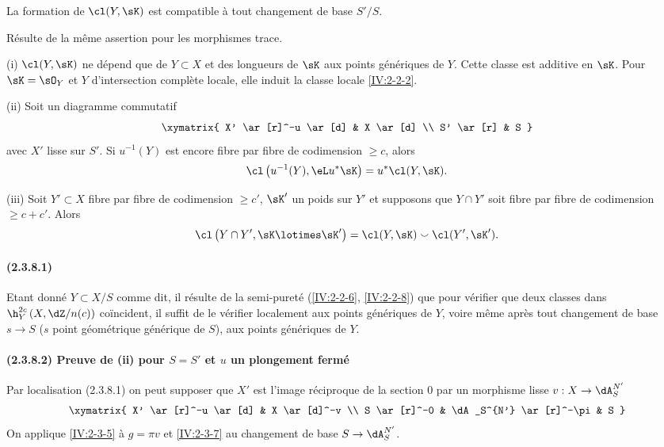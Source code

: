 \begin{lemma}\label{IV:2-3-7}
La formation de $\cl(Y,\sK)$ est compatible à tout changement de base 
$S'/S$.
\end{lemma}

Résulte de la même assertion pour les morphismes trace.





\begin{theorem}\label{IV:2-3-8}
(i) $\cl(Y,\sK)$ ne dépend que de $Y\subset X$ et des longueurs de $\sK$ aux 
points génériques de $Y$. Cette classe est additive en $\sK$. Pour 
$\sK=\sO_Y$ et $Y$ d'intersection complète locale, elle induit la classe 
locale \ref{IV:2-2-2}.

(ii) Soit un diagramme commutatif 
\[\xymatrix{
  X' \ar[r]^-u \ar[d] 
    & X \ar[d] \\
  S' \ar[r] 
    & S
}\]
avec $X'$ lisse sur $S'$. Si $u^{-1}(Y)$ est encore fibre par fibre de 
codimension $\geqslant c$, alors 
\[
  \cl\left(u^{-1}(Y),\eL u^\ast\sK\right) = u^\ast \cl(Y,\sK) \text{.}
\]

(iii) Soit $Y'\subset X$ fibre par fibre de codimension $\geqslant c'$, 
$\sK'$ un poids sur $Y'$ et supposons que $Y\cap Y'$ soit fibre par fibre de 
codimension $\geqslant c+c'$. Alors 
\[
\cl\left(Y\cap Y',\sK\lotimes \sK'\right) = \cl(Y,\sK) \smallsmile \cl(Y',\sK') \text{.}
\]
\end{theorem}



\paragraph{(2.3.8.1)}\label{IV:2-3-8-1}
Etant donné $Y\subset X/S$ comme dit, il résulte de la semi-pureté 
(\ref{IV:2-2-6}, \ref{IV:2-2-8}) que pour vérifier que deux classes dans 
$\h_Y^{2 c}\left(X,\dZ/n(c)\right)$ coïncident, il suffit de le vérifier 
localement aux points génériques de $Y$, voire même après tout 
changement de base $s\to S$ ($s$ point géométrique générique de $S$), 
aux points génériques de $Y$. 

\paragraph{(2.3.8.2) Preuve de (ii) pour $S=S'$ et $u$ un plongement fermé}
Par localisation (2.3.8.1) on peut supposer que $X'$ est l'image 
réciproque de la section $0$ par un morphisme lisse $v:X\to \dA_S^{N'}$ 
\[\xymatrix{
  X' \ar[r]^-u \ar[d] 
    & X \ar[d]^-v \\
  S \ar[r]^-0 
    & \dA_S^{N'} \ar[r]^-\pi 
    & S
}\]
On applique \ref{IV:2-3-5} à $g=\pi v$ et \ref{IV:2-3-7} au changement de 
base $S\to \dA_S^{N'}$. 

